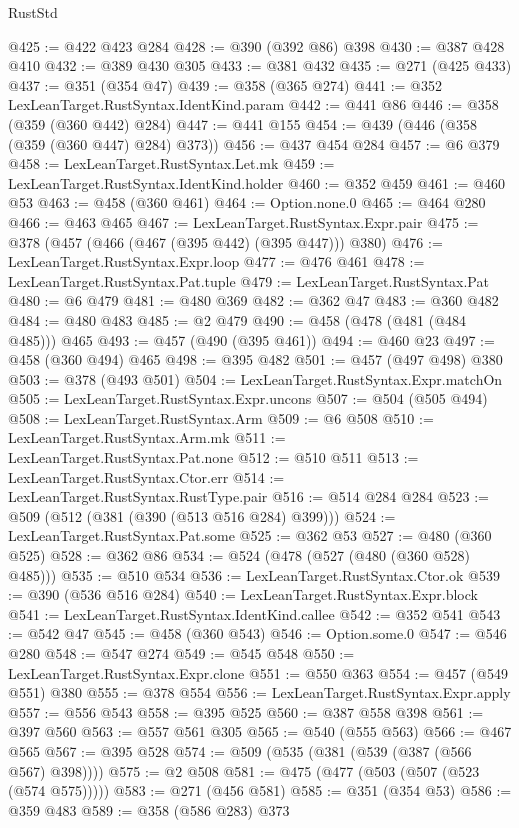 \begin{lexlean}{RustStd}
\begin{coremodule}
{\begin{coremodule}
{{{{{{{{{{{{{{@425 := @422 @423 @284
@428 := @390 (@392 @86) @398
@430 := @387 @428 @410
@432 := @389 @430 @305
@433 := @381 @432
@435 := @271 (@425 @433)
@437 := @351 (@354 @47)
@439 := @358 (@365 @274)
@441 := @352 LexLeanTarget.RustSyntax.IdentKind.param
@442 := @441 @86
@446 := @358 (@359 (@360 @442) @284)
@447 := @441 @155
@454 := @439 (@446 (@358 (@359 (@360 @447) @284) @373))
@456 := @437 @454 @284
@457 := @6 @379
@458 := LexLeanTarget.RustSyntax.Let.mk
@459 := LexLeanTarget.RustSyntax.IdentKind.holder
@460 := @352 @459
@461 := @460 @53
@463 := @458 (@360 @461)
@464 := Option.none.{0}
@465 := @464 @280
@466 := @463 @465
@467 := LexLeanTarget.RustSyntax.Expr.pair
@475 := @378 (@457 (@466 (@467 (@395 @442) (@395 @447))) @380)
@476 := LexLeanTarget.RustSyntax.Expr.loop
@477 := @476 @461
@478 := LexLeanTarget.RustSyntax.Pat.tuple
@479 := LexLeanTarget.RustSyntax.Pat
@480 := @6 @479
@481 := @480 @369
@482 := @362 @47
@483 := @360 @482
@484 := @480 @483
@485 := @2 @479
@490 := @458 (@478 (@481 (@484 @485))) @465
@493 := @457 (@490 (@395 @461))
@494 := @460 @23
@497 := @458 (@360 @494) @465
@498 := @395 @482
@501 := @457 (@497 @498) @380
@503 := @378 (@493 @501)
@504 := LexLeanTarget.RustSyntax.Expr.matchOn
@505 := LexLeanTarget.RustSyntax.Expr.uncons
@507 := @504 (@505 @494)
@508 := LexLeanTarget.RustSyntax.Arm
@509 := @6 @508
@510 := LexLeanTarget.RustSyntax.Arm.mk
@511 := LexLeanTarget.RustSyntax.Pat.none
@512 := @510 @511
@513 := LexLeanTarget.RustSyntax.Ctor.err
@514 := LexLeanTarget.RustSyntax.RustType.pair
@516 := @514 @284 @284
@523 := @509 (@512 (@381 (@390 (@513 @516 @284) @399)))
@524 := LexLeanTarget.RustSyntax.Pat.some
@525 := @362 @53
@527 := @480 (@360 @525)
@528 := @362 @86
@534 := @524 (@478 (@527 (@480 (@360 @528) @485)))
@535 := @510 @534
@536 := LexLeanTarget.RustSyntax.Ctor.ok
@539 := @390 (@536 @516 @284)
@540 := LexLeanTarget.RustSyntax.Expr.block
@541 := LexLeanTarget.RustSyntax.IdentKind.callee
@542 := @352 @541
@543 := @542 @47
@545 := @458 (@360 @543)
@546 := Option.some.{0}
@547 := @546 @280
@548 := @547 @274
@549 := @545 @548
@550 := LexLeanTarget.RustSyntax.Expr.clone
@551 := @550 @363
@554 := @457 (@549 @551) @380
@555 := @378 @554
@556 := LexLeanTarget.RustSyntax.Expr.apply
@557 := @556 @543
@558 := @395 @525
@560 := @387 @558 @398
@561 := @397 @560
@563 := @557 @561 @305
@565 := @540 (@555 @563)
@566 := @467 @565
@567 := @395 @528
@574 := @509 (@535 (@381 (@539 (@387 (@566 @567) @398))))
@575 := @2 @508
@581 := @475 (@477 (@503 (@507 (@523 (@574 @575)))))
@583 := @271 (@456 @581)
@585 := @351 (@354 @53)
@586 := @359 @483
@589 := @358 (@586 @283) @373
}}}}}}}}}}}}}}
\end{coremodule}}
\end{coremodule}
\end{lexlean}
